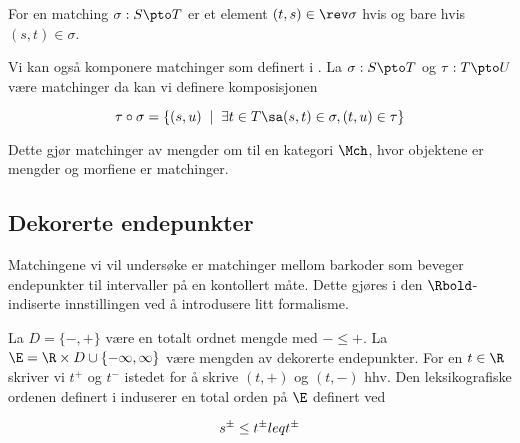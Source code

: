 \begin{definition}\label{Def:rev}
	For en matching $\sigma: S\pto T$ er et element $(t,s)\in\rev\sigma$ hvis og bare hvis $(s,t)\in\sigma$.
\end{definition}

Vi kan også komponere matchinger som definert i \cite{Bauer2015a}. La $\sigma: S\pto T$ og $\tau: T\pto U$ være matchinger da kan vi definere komposisjonen

\[\tau\circ\sigma = \{(s,u)\;\mid\; \exists t\in T\sa (s,t)\in\sigma, (t,u)\in\tau\}\]

Dette gjør matchinger av mengder om til en kategori $\Mch$, hvor objektene er mengder og morfiene er matchinger.

\subsection{Dekorerte endepunkter}
Matchingene vi vil undersøke er matchinger mellom barkoder som beveger endepunkter til intervaller på en kontollert måte. Dette gjøres i den $\Rbold$-indiserte innstillingen ved å introdusere litt formalisme.

La $D = \{-,+\}$ være en totalt ordnet mengde med $-\leq+$. La $\E = \R\times
D\cup\{-\infty,\infty\}$ være mengden av dekorerte endepunkter. For en $t\in\R$
skriver vi $t^+$ og $t^-$ istedet for å skrive $(t,+)$ og $(t,-)$ hhv. Den
leksikografiske ordenen definert i  induserer en total orden på
$\E$ definert ved

\[s^\pm\leq t^\pm\\leq t^\pm\]
